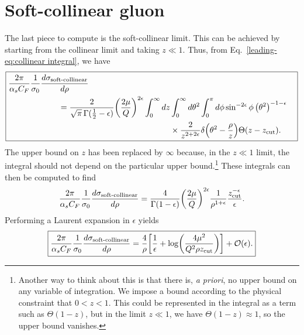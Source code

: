 \documentclass[../thesis.tex]{subfiles}
\providecommand{\zcut}{z_\mathrm{{cut}}}
\providecommand{\cO}{\mathcal{O}}
\begin{document}
\section{Soft-collinear gluon}
	The last piece to compute is the soft-collinear limit. This can be achieved by starting from the collinear limit and taking $z \ll 1$. Thus, from Eq.~\ref{leading-eq:collinear integral}, we have
	\begin{equation}
	\boxed{
	\begin{aligned}
		\frac{2\pi}{\alpha_s C_F} \frac{1}{\sigma_0}\frac{d\sigma_{\text{soft-collinear}}}{d\rho}\hspace{3.5cm} \\
		= \frac{2}{\sqrt{\pi}\,\Gamma(\frac{1}{2} - \epsilon)} \qty(\frac{2\mu}{Q})^{2\epsilon} \int_0^\infty dz &\int_0^\infty d\theta^2 \int_0^{\pi} d\phi \sin^{-2\epsilon}\phi\,\qty(\theta^2)^{-1-\epsilon} \\
			&\times  \frac{2}{z^{2+2\epsilon}} \delta\qty(\theta^2 - \frac{\rho}{z}) \Theta\qty(z - \zcut).
	\end{aligned}
	}
	\end{equation}
	The upper bound on $z$ has been replaced by $\infty$ because, in the $z \ll 1$ limit, the integral should not depend on the particular upper bound.\footnote{Another way to think about this is that there is, \textit{a priori}, no upper bound on any variable of integration. We impose a bound according to the physical constraint that $0 < z < 1$. This could be represented in the integral as a term such as $\Theta(1 - z)$, but in the limit $z \ll 1$, we have $\Theta(1 - z) \approx 1$, so the upper bound vanishes.} These integrals can then be computed to find
	\begin{equation}
	\begin{aligned}
		\frac{2\pi}{\alpha_s C_F} \frac{1}{\sigma_0}\frac{d\sigma_{\text{soft-collinear}}}{d\rho} = \frac{4}{\Gamma(1 - \epsilon)} \qty(\frac{2\mu}{Q})^{2\epsilon} \frac{1}{\rho^{1+\epsilon}} \frac{\zcut^{-\epsilon}}{\epsilon}.
	\end{aligned}
	\end{equation}
	Performing a Laurent expansion in $\epsilon$ yields
	\begin{equation}\label{leading-eq:soft-collinear result}
	\boxed{
		\frac{2\pi}{\alpha_s C_F} \frac{1}{\sigma_0}\frac{d\sigma_{\text{soft-collinear}}}{d\rho} = \frac{4}{\rho}\qty[\frac{1}{\epsilon} + \log(\frac{4\mu^2}{Q^2 \rho \zcut})] + \cO(\epsilon).
	}
	\end{equation}
\end{document}
